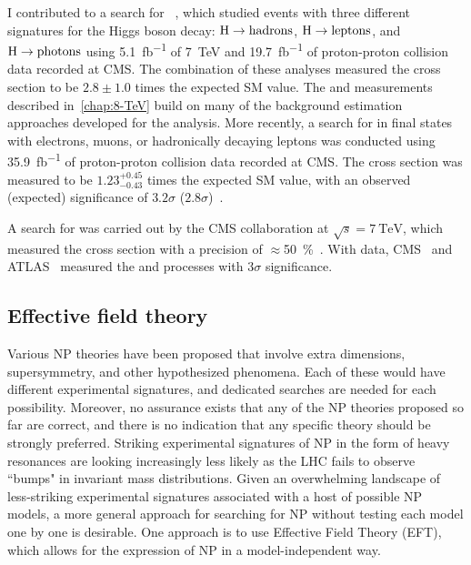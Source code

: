 I contributed to a search for \ttH ~\cite{Khachatryan2014ttH}, which studied events with three different signatures for the Higgs boson decay: $\text{H} \rightarrow \text{hadrons}$, $\text{H} \rightarrow \text{leptons}$, and $\text{H} \rightarrow \text{photons}$ using \SI{5.1}{fb^{-1}} of \SI{7}{\TeV} and \SI{19.7}{fb^{-1}} of \eightTeV proton-proton collision data recorded at CMS. The combination of these analyses measured the \ttH cross section to be $2.8 \pm
1.0$ times the expected SM value. The \ttW and \ttZ measurements described in~\cref{chap:8-TeV} build on many of the background estimation approaches developed for the \ttH analysis. More recently, a search for \ttH in final states with electrons, muons, or hadronically decaying \Ptau leptons was conducted using \SI{35.9}{fb^{-1}} of \thirteenTeV proton-proton collision data recorded at CMS.  The cross section was measured to be $1.23^{+0.45}_{-0.43}$ times the expected SM value, with an observed (expected) significance of $3.2\sigma$ ($2.8\sigma$)~\cite{CMS-PAS-HIG-17-003,CMS-PAS-HIG-17-004}.

A search for \ttZ was carried out by the CMS collaboration at $\sqrt{s} =
\SI{7}{\TeV}$, which measured the cross section with a precision of $\approx$\SI{50}{\percent}~\cite{PRL-110-172002}. With \eightTeV data, CMS~\cite{EPJC-C74-2014-9} and ATLAS~\cite{ATLAS-CONF-2014-038} measured the \ttW and \ttZ processes with $3\sigma$ significance.

\subsection{Effective field theory}
\label{ssec:eft}

Various NP theories have been proposed that involve extra dimensions,
supersymmetry, and other hypothesized phenomena. Each of these would have
different experimental signatures, and dedicated searches are needed for each
possibility. Moreover, no assurance exists that any of the NP theories proposed
so far are correct, and there is no indication that any specific theory should
be strongly preferred. Striking experimental signatures of NP in the form of
heavy resonances are looking increasingly less likely as the LHC fails to
observe ``bumps" in invariant mass distributions. Given an overwhelming
landscape of less-striking experimental signatures associated with a host of
possible NP models, a more general approach for searching for NP without testing
each model one by one is desirable. One approach is to use Effective Field
Theory (EFT), which allows for the expression of NP in a model-independent way.

